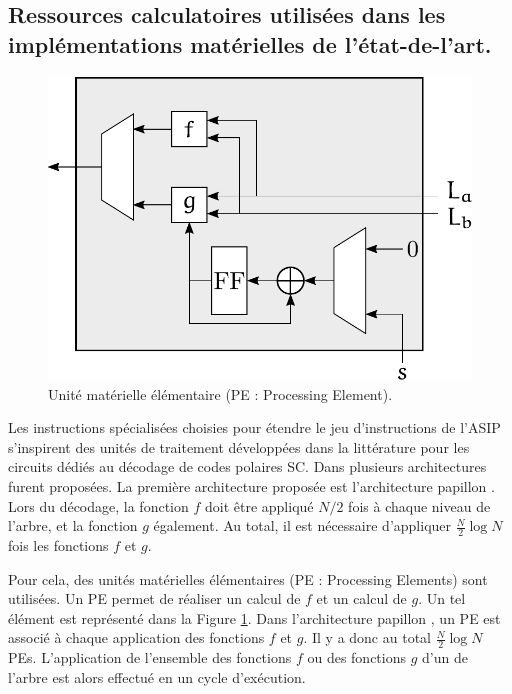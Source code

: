 \subsection{Ressources calculatoires utilisées dans les implémentations matérielles de l'état-de-l'art.}
\label{subsec:hard_sc}

\begin{figure}[t]
\centering
\includegraphics[scale=0.75]{main/ch3_fig/PE}
\caption{Unité matérielle élémentaire (PE : Processing Element).}
\label{fig:pe}
\end{figure}


Les instructions spécialisées choisies pour étendre le jeu d'instructions de l'ASIP s'inspirent des unités de traitement développées dans la littérature pour les circuits dédiés au décodage de codes polaires SC. Dans \cite{leroux_hardware_2011} plusieurs architectures furent proposées. La première architecture proposée est l'architecture \og papillon \fg. Lors du décodage, la fonction $f$ doit être appliqué $N/2$ fois à chaque niveau de l'arbre, et la fonction $g$ également. Au total, il est nécessaire d'appliquer $\frac{N}{2} \log N$ fois les fonctions $f$ et $g$. 

Pour cela, des unités matérielles élémentaires (PE : Processing Elements) sont utilisées.
Un PE permet de réaliser un calcul de $f$ et un calcul de $g$. Un tel élément est représenté dans la Figure \ref{fig:pe}.
Dans l'architecture \og papillon \fg, un PE est associé à chaque application des fonctions $f$ et $g$.
Il y a donc au total $\frac{N}{2} \log N$ PEs.
L'application de l'ensemble des fonctions $f$ ou des fonctions $g$ d'un \noeud de l'arbre est alors effectué en un cycle d'exécution.

